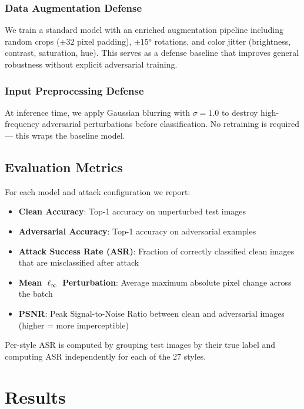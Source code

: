 \documentclass[conference]{IEEEtran}
\begin{document}
\subsubsection{Data Augmentation Defense}

We train a standard model with an enriched augmentation pipeline including random crops ($\pm 32$ pixel padding), $\pm 15°$ rotations, and color jitter (brightness, contrast, saturation, hue). This serves as a defense baseline that improves general robustness without explicit adversarial training.

\subsubsection{Input Preprocessing Defense}

At inference time, we apply Gaussian blurring with $\sigma=1.0$ to destroy high-frequency adversarial perturbations before classification. No retraining is required — this wraps the baseline model.

\subsection{Evaluation Metrics}

For each model and attack configuration we report:
\begin{itemize}
    \item \textbf{Clean Accuracy}: Top-1 accuracy on unperturbed test images
    \item \textbf{Adversarial Accuracy}: Top-1 accuracy on adversarial examples
    \item \textbf{Attack Success Rate (ASR)}: Fraction of correctly classified clean images that are misclassified after attack
    \item \textbf{Mean $\ell_\infty$ Perturbation}: Average maximum absolute pixel change across the batch
    \item \textbf{PSNR}: Peak Signal-to-Noise Ratio between clean and adversarial images (higher = more imperceptible)
\end{itemize}

Per-style ASR is computed by grouping test images by their true label and computing ASR independently for each of the 27 styles.

\section{Results}
\end{document}
